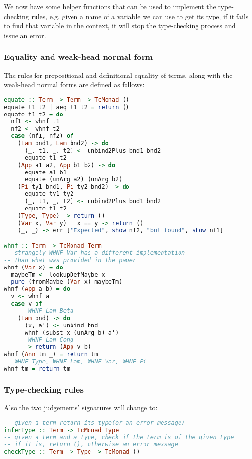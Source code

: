 \documentclass[
       embeddedlogo,
       english,
       lmodern,
       coorientadorbanca,
       noabntexcite
]{ufsc-thesis-rn46-2019}
\theoremstyle{definition}
\newcommand{\code}[1]{\text{\scpfamily\setlength\spaceskip{0.35em}#1}}
\begin{document}
We now have some helper functions that can be used to implement the type-checking rules, e.g. given a name of a variable we can use \code{lookupTy} to get its type, if it fails to find that variable in the context, it will stop the type-checking process and issue an error.

\subsubsection{Equality and weak-head normal form}

The rules for propositional and definitional equality of terms, along with the weak-head normal forms are defined as follows:
\begin{lstlisting}[language=Haskell]
equate :: Term -> Term -> TcMonad ()
equate t1 t2 | aeq t1 t2 = return ()
equate t1 t2 = do
  nf1 <- whnf t1
  nf2 <- whnf t2
  case (nf1, nf2) of
    (Lam bnd1, Lam bnd2) -> do
      (_, t1, _, t2) <- unbind2Plus bnd1 bnd2
      equate t1 t2
    (App a1 a2, App b1 b2) -> do
      equate a1 b1
      equate (unArg a2) (unArg b2)
    (Pi ty1 bnd1, Pi ty2 bnd2) -> do
      equate ty1 ty2
      (_, t1, _, t2) <- unbind2Plus bnd1 bnd2
      equate t1 t2
    (Type, Type) -> return ()
    (Var x, Var y) | x == y -> return ()
    (_, _) -> err ["Expected", show nf2, "but found", show nf1]

whnf :: Term -> TcMonad Term
-- strangely WHNF-Var has a different implementation
-- than what was provided in the paper
whnf (Var x) = do
  maybeTm <- lookupDefMaybe x
  pure (fromMaybe (Var x) maybeTm)
whnf (App a b) = do
  v <- whnf a
  case v of
    -- WHNF-Lam-Beta
    (Lam bnd) -> do
      (x, a') <- unbind bnd
      whnf (subst x (unArg b) a')
    -- WHNF-Lam-Cong
    _ -> return (App v b)
whnf (Ann tm _) = return tm
-- WHNF-Type, WHNF-Lam, WHNF-Var, WHNF-Pi
whnf tm = return tm
\end{lstlisting}

\subsubsection{Type-checking rules}
Also the two judgements' signatures will change to:

\begin{lstlisting}[language=Haskell]
-- given a term return its type(or an error message)
inferType :: Term -> TcMonad Type
-- given a term and a type, check if the term is of the given type
-- if it is, return (), otherwise an error message
checkType :: Term -> Type -> TcMonad ()
\end{lstlisting}
\end{document}
